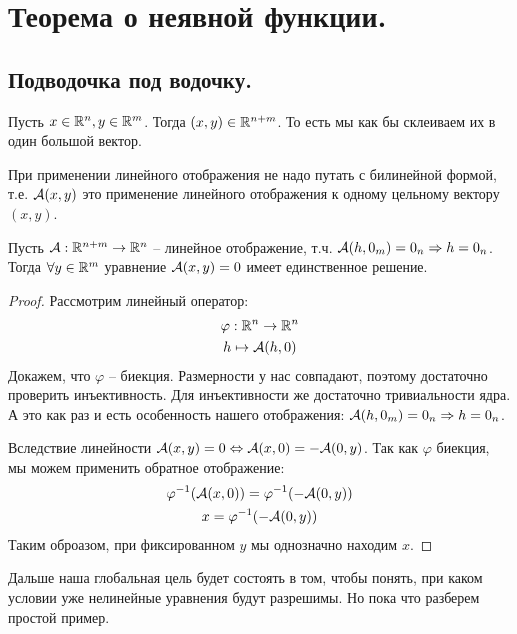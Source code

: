\section{Теорема о неявной функции.}
\subsection*{Подводочка под водочку.}
\begin{conj}
    Пусть $x \in \mathbb{R}^n, y \in \mathbb{R}^m$. 
    Тогда $(x, y) \in \mathbb{R}^{n + m}$.  
    То есть мы как бы склеиваем их в один большой вектор.
\end{conj}

\begin{notice}
    При применении линейного отображения не надо путать с билинейной формой, т.е. $\mathcal{A}(x, y)$ это применение линейного отображения к одному цельному вектору $(x, y)$.
\end{notice}

\begin{lemma}
    Пусть $\mathcal{A} : \mathbb{R}^{n + m} \to \mathbb{R}^n$ -- линейное отображение, т.ч. $\mathcal{A}(h, 0_m) = 0_n \Rightarrow h = 0_n$.
    \\ Тогда $\forall y \in \mathbb{R}^m$ уравнение $\mathcal{A}(x, y) = 0$ имеет единственное решение.
\end{lemma}
\begin{proof}
    Рассмотрим линейный оператор: \begin{gather*}
        \varphi: \mathbb{R}^n \to \mathbb{R}^n \\
        h \mapsto \mathcal{A}(h, 0)
    \end{gather*}
    \quad Докажем, что $\varphi$ -- биекция.
    Размерности у нас совпадают, поэтому достаточно проверить инъективность.
    Для инъективности же достаточно тривиальности ядра. 
    А это как раз и есть особенность нашего отображения: $\mathcal{A}(h, 0_m) = 0_n \Rightarrow h = 0_n$.

    \quad Вследствие линейности $\mathcal{A}(x, y) = 0 \Leftrightarrow \mathcal{A}(x, 0) = -\mathcal{A}(0, y)$.
    Так как $\varphi$ биекция, мы можем применить обратное отображение:
    \begin{gather*} 
        \varphi^{-1}(\mathcal{A}(x, 0)) = \varphi^{-1}(-\mathcal{A}(0, y)) \\
        x = \varphi^{-1}(-\mathcal{A}(0, y))
    \end{gather*}
    \quad Таким оброазом, при фиксированном $y$ мы однозначно находим $x$. 
\end{proof}

Дальше наша глобальная цель будет состоять в том, чтобы понять, при каком условии уже нелинейные уравнения будут разрешимы.
Но пока что разберем простой пример.

